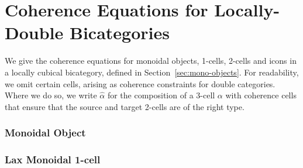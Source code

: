 \section{Coherence Equations for Locally-Double Bicategories}
\label{ap:coherence}

We give the coherence equations for  monoidal objects, 1-cells, 2-cells and icons in a locally cubical bicategory, defined in Section~\ref{sec:mono-objects}. For readability, we omit certain cells, arising as coherence constraints for double categories. Where we do so, we write $\hat{\alpha}$ for the composition of a 3-cell ${\alpha}$ with coherence cells that ensure that the source and target 2-cells are of the right type.

\subsubsection*{Monoidal Object}

 \newpage
 \newpage
 \newpage


\subsubsection*{Lax Monoidal 1-cell}

 \newpage
 \newpage



%


%

